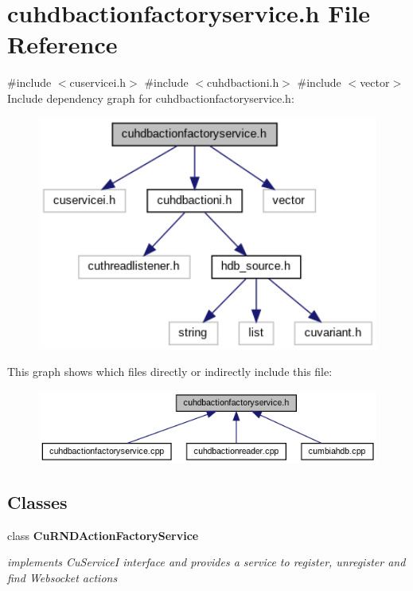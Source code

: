 \section{cuhdbactionfactoryservice.\+h File Reference}
\label{cuhdbactionfactoryservice_8h}
{\ttfamily \#include $<$cuservicei.\+h$>$}\newline
{\ttfamily \#include $<$cuhdbactioni.\+h$>$}\newline
{\ttfamily \#include $<$vector$>$}\newline
Include dependency graph for cuhdbactionfactoryservice.\+h\+:
\nopagebreak
\begin{figure}[H]
\begin{center}
\leavevmode
\includegraphics[width=350pt]{cuhdbactionfactoryservice_8h__incl}
\end{center}
\end{figure}
This graph shows which files directly or indirectly include this file\+:
\nopagebreak
\begin{figure}[H]
\begin{center}
\leavevmode
\includegraphics[width=350pt]{cuhdbactionfactoryservice_8h__dep__incl}
\end{center}
\end{figure}
\subsection*{Classes}
\begin{DoxyCompactItemize}
\item 
class \textbf{ Cu\+R\+N\+D\+Action\+Factory\+Service}
\begin{DoxyCompactList}\small\item\em implements Cu\+ServiceI interface and provides a service to register, unregister and find {\itshape Websocket actions} \end{DoxyCompactList}\end{DoxyCompactItemize}
